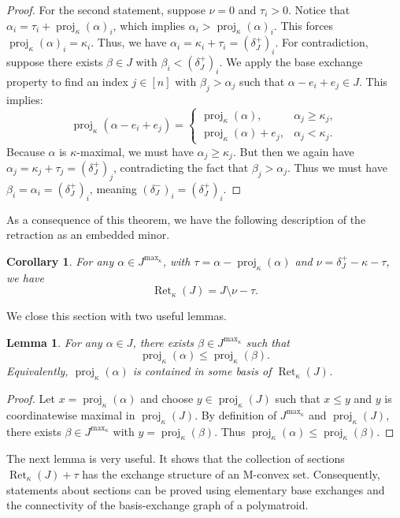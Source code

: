 \documentclass[10pt,a4paper]{amsart}
\newtheorem{lemma}[theorem]{Lemma}
\newtheorem{corollary}[theorem]{Corollary}
\newcommand{\delplus}{\delta_J^+}
\newcommand{\delminus}{\delta_J^-}
\DeclareMathOperator{\proj}{proj}              %
\newcommand{\kproj}{\proj_{\kappa}}            %
\DeclareMathOperator{\Ret}{Ret}                %
\newcommand{\RetK}{\Ret_{\kappa}}              %
\newcommand{\Jmax}{J^{\max_{\kappa}}}
\begin{document}
\begin{proof}
    For the second statement, suppose $\nu = 0$ and $\tau_i > 0$. Notice that $\alpha_i = \tau_i + \kproj(\alpha)_i$, which implies $\alpha_i > \kproj(\alpha)_i$. This forces $\kproj(\alpha)_i = \kappa_i$. Thus, we have $\alpha_i = \kappa_i + \tau_i = (\delplus)_i$. For contradiction, suppose there exists $\beta \in J$ with $\beta_i < (\delplus)_i$. We apply the base exchange property to find an index $j \in [n]$ with $\beta_j > \alpha_j$ such that $\alpha - e_i + e_j \in J$. This implies: 
    \[
    \kproj(\alpha - e_i + e_j) = \begin{cases}
        \kproj(\alpha), & \alpha_j \geq \kappa_j, \\
        \kproj(\alpha) + e_j, & \alpha_j < \kappa_j.
    \end{cases}
    \]
    Because $\alpha$ is $\kappa$-maximal, we must have $\alpha_j \geq \kappa_j$. But then we again have $\alpha_j = \kappa_j + \tau_j = (\delplus)_j$, contradicting the fact that $\beta_j > \alpha_j$. Thus we must have $\beta_i = \alpha_i = (\delplus)_i$, meaning $(\delminus)_i = (\delplus)_i$.
\end{proof}

As a consequence of this theorem, we have the following description of the retraction as an embedded minor.
\begin{corollary} \label{corollary:description_of_embedded_minor}
    For any $\alpha \in \Jmax$, with $\tau = \alpha - \kproj(\alpha)$ and $\nu = \delplus - \kappa - \tau$, we have \[
    \RetK(J) = J \setminus \nu - \tau.
    \]
\end{corollary}

We close this section with two useful lemmas.

\begin{lemma}\label{lemma:projection_always_independent}
    For any $\alpha\in J$, there exists $\beta\in\Jmax$ such that
    \[
        \kproj(\alpha)\leq\kproj(\beta).
    \]
    Equivalently, $\kproj(\alpha)$ is contained in some basis of $\RetK(J)$.
\end{lemma}
\begin{proof}
    Let $x = \kproj(\alpha)$ and choose $y \in \kproj(J)$ such that $x \leq y$ and $y$ is coordinatewise maximal in $\kproj(J)$. By definition of $\Jmax$ and $\kproj(J)$, there exists $\beta \in \Jmax$ with $y = \kproj(\beta)$. Thus $\kproj(\alpha) \leq \kproj(\beta)$.
\end{proof}

The next lemma is very useful. It shows that the collection of sections $\RetK(J)+\tau$ has the exchange structure of an M-convex set. Consequently, statements about sections can be proved using elementary base exchanges and the connectivity of the basis-exchange graph of a polymatroid.
\end{document}
